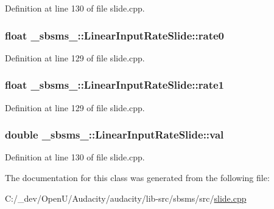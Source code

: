 Definition at line 130 of file slide.\+cpp.

\subsubsection[{\texorpdfstring{rate0}{rate0}}]{\setlength{\rightskip}{0pt plus 5cm}float \+\_\+sbsms\+\_\+\+::\+Linear\+Input\+Rate\+Slide\+::rate0\hspace{0.3cm}{\ttfamily [protected]}}\hypertarget{class__sbsms___1_1_linear_input_rate_slide_a02082a8abed7e393a0422a065c938872}{}\label{class__sbsms___1_1_linear_input_rate_slide_a02082a8abed7e393a0422a065c938872}


Definition at line 129 of file slide.\+cpp.

\subsubsection[{\texorpdfstring{rate1}{rate1}}]{\setlength{\rightskip}{0pt plus 5cm}float \+\_\+sbsms\+\_\+\+::\+Linear\+Input\+Rate\+Slide\+::rate1\hspace{0.3cm}{\ttfamily [protected]}}\hypertarget{class__sbsms___1_1_linear_input_rate_slide_a540d2f109dd59741967459029dcf76a8}{}\label{class__sbsms___1_1_linear_input_rate_slide_a540d2f109dd59741967459029dcf76a8}


Definition at line 129 of file slide.\+cpp.

\subsubsection[{\texorpdfstring{val}{val}}]{\setlength{\rightskip}{0pt plus 5cm}double \+\_\+sbsms\+\_\+\+::\+Linear\+Input\+Rate\+Slide\+::val\hspace{0.3cm}{\ttfamily [protected]}}\hypertarget{class__sbsms___1_1_linear_input_rate_slide_a607f2f53f52bf16b69247471d992eeef}{}\label{class__sbsms___1_1_linear_input_rate_slide_a607f2f53f52bf16b69247471d992eeef}


Definition at line 130 of file slide.\+cpp.



The documentation for this class was generated from the following file\+:\begin{DoxyCompactItemize}
\item 
C\+:/\+\_\+dev/\+Open\+U/\+Audacity/audacity/lib-\/src/sbsms/src/\hyperlink{slide_8cpp}{slide.\+cpp}\end{DoxyCompactItemize}
